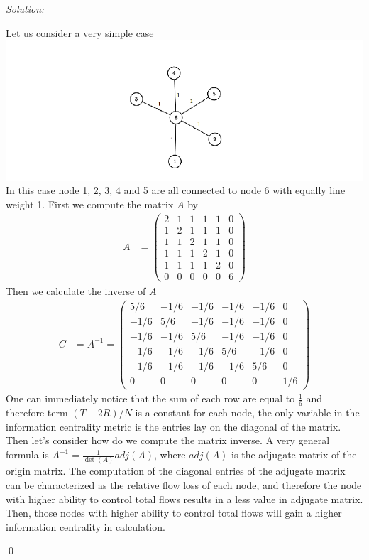 \documentclass[12pt]{article}
\newenvironment{sol}
    {\emph{Solution:}
    }
    {
    \qed
    }
\begin{document}
	\begin{sol}
		Let us consider a very simple case \\
		\includegraphics[width=\linewidth]{./3.png}\\
		In this case node 1, 2, 3, 4 and 5 are all connected to node 6 with equally line weight 1. First we compute the matrix $A$ by 
		\begin{align*}
			A &= \begin{pmatrix}2 & 1 & 1 & 1 & 1 & 0 \\ 1 & 2 & 1 & 1 & 1 & 0 \\ 1 & 1 & 2 & 1 & 1 & 0 \\ 1 & 1 & 1 & 2 & 1 & 0 \\ 1 & 1 & 1 & 1 & 2 & 0 \\ 0 & 0 & 0 & 0 & 0 & 6 \end{pmatrix}
		\end{align*}
		Then we calculate the inverse of $A$
		\begin{align*}
			C &= A^{-1} = \begin{pmatrix}5/6 & -1/6 & -1/6 & -1/6 & -1/6 & 0 \\ -1/6 & 5/6 & -1/6 & -1/6 & -1/6 & 0 \\-1/6 & -1/6 & 5/6 & -1/6 & -1/6 & 0 \\-1/6 & -1/6 & -1/6 & 5/6 & -1/6 & 0 \\-1/6 & -1/6 & -1/6 & -1/6 & 5/6 & 0 \\0 & 0 & 0 & 0 & 0 & 1/6\end{pmatrix}
		\end{align*}
		One can immediately notice that the sum of each row are equal to $\frac{1}{6}$ and therefore term $(T-2R)/N$ is a constant for each node, the only variable in the information centrality metric is the entries lay on the diagonal of the matrix. \\
		Then let's consider how do we compute the matrix inverse. A very general formula is $A^{-1} = \frac{1}{\det(A)}adj(A)$, where $adj(A)$ is the adjugate matrix of the origin matrix.  The computation of  the diagonal entries of the adjugate matrix can be characterized as the relative flow loss of each node, and therefore the node with higher ability to control total flows results in a less value in adjugate matrix. Then, those nodes with higher ability to control total flows will gain a higher information centrality in calculation. 
	\end{sol}
\end{document}
